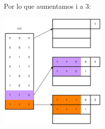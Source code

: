 \documentclass{templateNote}
\begin{document}
\begin{itemize}
\begin{enumerate}
{\begin{center}
            \end{center}
            Por lo que aumentamos i a 3:
            \begin{center}
                \includegraphics[width=0.4\textwidth]{diagram/Problema2-242.png}
            \end{center}
        }
    \end{enumerate}
\end{itemize}   
\end{document}
